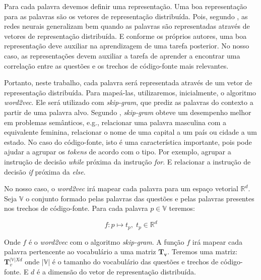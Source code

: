Para cada palavra devemos definir uma representação. Uma boa representação para as palavras são os vetores de representação distribuída. Pois, segundo \cite{Goodfellow-et-al-2016}, as redes neurais generalizam bem quando as palavras são representadas através de vetores de representação distribuída. E conforme os próprios autores, uma boa representação deve auxiliar na aprendizagem de uma tarefa posterior. No nosso caso, as representações devem auxiliar a tarefa de aprender a encontrar uma correlação entre as questões e os trechos de código-fonte mais relevantes.

Portanto, neste trabalho, cada palavra será representada através de um vetor de representação distribuída. Para mapeá-las, utilizaremos, inicialmente, o algoritmo \textit{word2vec}. Ele será utilizado com \textit{skip-gram}, que prediz as palavras do contexto a partir de uma palavra alvo. Segundo \cite{mikolov2013distributed}, \textit{skip-gram} obteve um desempenho melhor em problemas semânticos, e.g., relacionar uma palavra masculina com a equivalente feminina, relacionar o nome de uma capital a um país ou cidade a um estado. No caso do código-fonte, isto é uma característica importante, pois pode ajudar a agrupar os \textit{tokens} de acordo com o tipo. Por exemplo, agrupar a instrução de decisão \textit{while} próxima da instrução \textit{for}. E relacionar a instrução de decisão \textit{if} próxima da \textit{else}.

No nosso caso, o \textit{word2vec} irá mapear cada palavra para um espaço vetorial $\mathbb{R}^{d}$. Seja $\mathbb{V}$ o conjunto formado pelas palavras das questões e pelas palavras presentes nos trechos de código-fonte. Para cada palavra ${p} \in \mathbb{V}$ teremos:

\begin{equation}
    f: {p} \mapsto t_{p},\; t_{p} \in \mathbb{R}^{d}
\end{equation}

Onde $f$ é o \textit{word2vec} com o algoritmo \textit{skip-gram}. A função $f$ irá mapear cada palavra pertencente ao vocabulário a uma matriz $\bm{T_{v}}$.
Teremos uma matriz: $\bm{T}_{v}^{|\mathbb{V}| X d}$ onde $|\mathbb{V}|$ é o tamanho do vocabulário das questões e trechos de código-fonte. E $d$ é a dimensão do vetor de representação distribuída.

